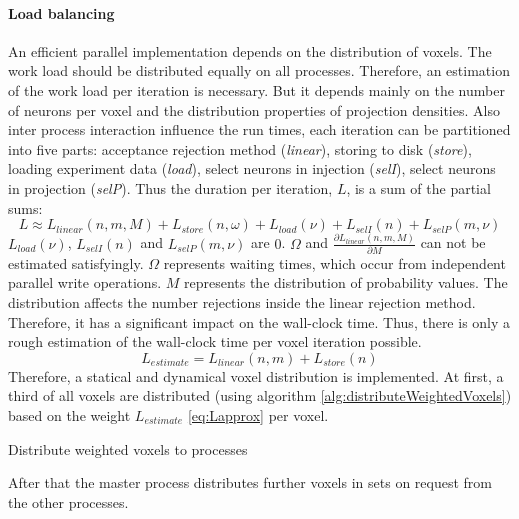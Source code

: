 \paragraph{Load balancing}
\label{par:loadbalancing}
An efficient parallel implementation depends on the distribution of voxels.
The work load should be distributed equally on all processes.
Therefore, an estimation of the work load per iteration is necessary.
But it depends mainly on the number of neurons per voxel and the distribution properties of projection densities.
Also inter process interaction influence the run times,
each iteration can be partitioned into five parts: acceptance rejection method (\emph{linear}), storing to disk (\emph{store}),
loading experiment data (\emph{load}), select neurons in injection (\emph{selI}), select neurons in projection (\emph{selP}).
Thus the duration per iteration, $L$, is a sum of the partial sums:
\begin{equation} \label{eq:L}
	L \approx L_{linear}(n,m,M) + L_{store}(n,\omega) + L_{load}(\nu) + L_{selI}(n) + L_{selP}(m,\nu)
\end{equation}
$L_{load}(\nu)$, $L_{selI}(n)$ and $L_{selP}(m,\nu)$ are $0$.
$\Omega$ and $\frac{\partial L_{linear}(n,m,M)}{\partial M}$  can not be estimated satisfyingly.
$\Omega$ represents waiting times, which occur from independent parallel write operations.
$M$ represents the distribution of probability values.
The distribution affects the number rejections inside the linear rejection method.
Therefore, it has a significant impact on the wall-clock time.
Thus, there is only a rough estimation of the wall-clock time per voxel iteration possible.
\begin{equation} \label{eq:Lapprox}
	L_{estimate} = L_{linear}(n,m) + L_{store}(n)
\end{equation}
Therefore, a statical and dynamical voxel distribution is implemented.
At first, a third of all voxels are distributed (using algorithm \ref{alg:distributeWeightedVoxels}) based on the weight $L_{estimate}$ \ref{eq:Lapprox}  per voxel.
\begin{algorithm}[ht!]
\caption{Distribute weighted voxels to processes}
\label{alg:distributeWeightedVoxels}
\end{algorithm}
After that the master process distributes further voxels in sets on request from the other processes.

